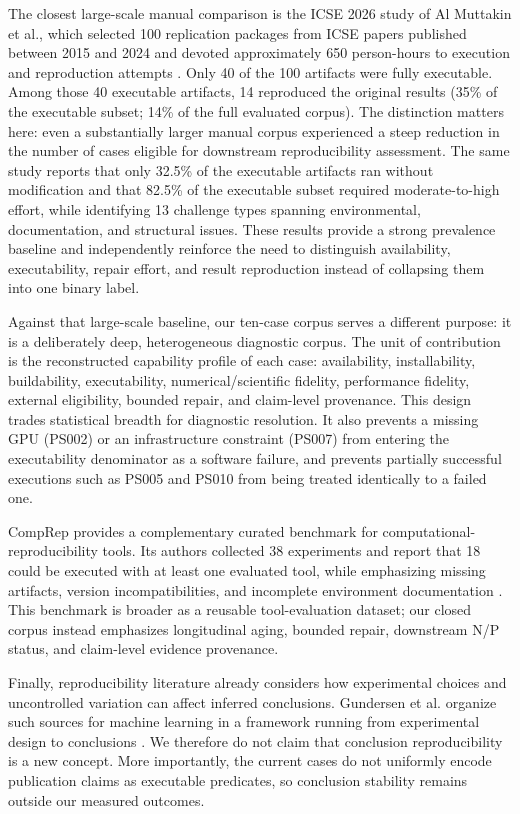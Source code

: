 \documentclass[a4paper,fleqn]{cas-dc}
\begin{document}
The closest large-scale manual comparison is the ICSE 2026 study of Al Muttakin et al., which selected 100 replication packages from ICSE papers published between 2015 and 2024 and devoted approximately 650 person-hours to execution and reproduction attempts \citep{muttakin2026openscience}. Only 40 of the 100 artifacts were fully executable. Among those 40 executable artifacts, 14 reproduced the original results (35\% of the executable subset; 14\% of the full evaluated corpus). The distinction matters here: even a substantially larger manual corpus experienced a steep reduction in the number of cases eligible for downstream reproducibility assessment. The same study reports that only 32.5\% of the executable artifacts ran without modification and that 82.5\% of the executable subset required moderate-to-high effort, while identifying 13 challenge types spanning environmental, documentation, and structural issues. These results provide a strong prevalence baseline and independently reinforce the need to distinguish availability, executability, repair effort, and result reproduction instead of collapsing them into one binary label.

Against that large-scale baseline, our ten-case corpus serves a different purpose: it is a deliberately deep, heterogeneous diagnostic corpus. The unit of contribution is the reconstructed capability profile of each case: availability, installability, buildability, executability, numerical/scientific fidelity, performance fidelity, external eligibility, bounded repair, and claim-level provenance. This design trades statistical breadth for diagnostic resolution. It also prevents a missing GPU (PS002) or an infrastructure constraint (PS007) from entering the executability denominator as a software failure, and prevents partially successful executions such as PS005 and PS010 from being treated identically to a failed one.

CompRep provides a complementary curated benchmark for computational-reproducibility tools. Its authors collected 38 experiments and report that 18 could be executed with at least one evaluated tool, while emphasizing missing artifacts, version incompatibilities, and incomplete environment documentation \citep{costa2025comprep}. This benchmark is broader as a reusable tool-evaluation dataset; our closed corpus instead emphasizes longitudinal aging, bounded repair, downstream N/P status, and claim-level evidence provenance.

Finally, reproducibility literature already considers how experimental choices and uncontrolled variation can affect inferred conclusions. Gundersen et al. organize such sources for machine learning in a framework running from experimental design to conclusions \citep{gundersen2022sources}. We therefore do not claim that conclusion reproducibility is a new concept. More importantly, the current cases do not uniformly encode publication claims as executable predicates, so conclusion stability remains outside our measured outcomes.
\end{document}

